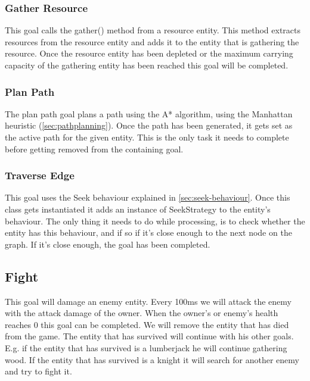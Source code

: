 \subsubsection{Gather Resource} 
\label{sec:gatherresource} 
This goal calls the gather() method from a resource entity. This method 
extracts resources from the resource entity and adds it to the entity that is 
gathering the resource. Once the resource entity has been depleted or the 
maximum carrying capacity of the gathering entity has been reached this goal 
will be completed.

\subsubsection{Plan Path} 
\label{sec:planpath} 
The plan path goal plans a path using the A* algorithm, using the Manhattan 
heuristic (\cref{sec:pathplanning}). Once the path has been generated, it gets 
set as the active path for the given entity. This is the only task it needs to 
complete before getting removed from the containing goal.

\subsubsection{Traverse Edge} 
\label{sec:traverseedge} 
This goal uses the Seek behaviour explained in \cref{sec:seek-behaviour}. Once 
this class gets instantiated it adds an instance of SeekStrategy to the 
entity's behaviour. The only thing it needs to do while processing, is to 
check whether the entity has this behaviour, and if so if it's close enough to 
the next node on the graph. If it's close enough, the goal has been completed.

\subsection{Fight} 
\label{sec:fight} 
This goal will damage an enemy entity. Every 100ms we will attack the enemy 
with the attack damage of the owner. When the owner’s or enemy’s health 
reaches 0 this goal can be completed. We will remove the entity that has died 
from the game. The entity that has survived will continue with his other 
goals. E.g. if the entity that has survived is a lumberjack he will continue 
gathering wood. If the entity that has survived is a knight it will search for 
another enemy and try to fight it.
